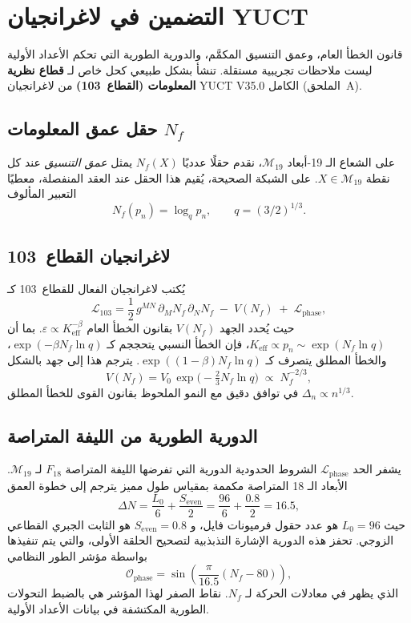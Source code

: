 \documentclass[11pt,a4paper]{article}
\begin{document}
	\section{التضمين في لاغرانجيان YUCT}
	\label{sec:lagrangian-embedding}
	
	قانون الخطأ العام، وعمق التنسيق المكمَّم، والدورية الطورية التي تحكم الأعداد الأولية ليست ملاحظات تجريبية مستقلة. تنشأ بشكل طبيعي كحل خاص لـ \textbf{قطاع نظرية المعلومات (القطاع~103)} من لاغرانجيان YUCT V35.0 الكامل (الملحق~A).
	
	\subsection{حقل عمق المعلومات \(N_f\)}
	
	على الشعاع الـ 19-أبعاد \(\mathcal{M}_{19}\)، نقدم حقلًا عدديًا \(N_f(X)\) يمثل \emph{عمق التنسيق} عند كل نقطة \(X \in \mathcal{M}_{19}\). على الشبكة الصحيحة، يُقيم هذا الحقل عند العقد المنفصلة، معطيًا التعبير المألوف
	\[
	N_f(p_n) = \log_q p_n, \qquad q = (3/2)^{1/3}.
	\]
	
	\subsection{لاغرانجيان القطاع~103}
	
	يُكتب لاغرانجيان الفعال للقطاع~103 كـ
	\begin{equation}\label{eq:L103}
		\mathcal{L}_{103} =
		\frac{1}{2}\,g^{MN}\,\partial_M N_f\,\partial_N N_f
		\;-\; V(N_f)
		\;+\; \mathcal{L}_{\text{phase}},
	\end{equation}
	حيث يُحدد الجهد \(V(N_f)\) بقانون الخطأ العام \(\varepsilon \propto K_{\mathrm{eff}}^{-\beta}\). بما أن \(K_{\mathrm{eff}} \propto p_n \sim \exp(N_f \ln q)\)، فإن الخطأ النسبي يتحججم كـ \(\exp(-\beta N_f \ln q)\)، والخطأ المطلق يتصرف كـ \(\exp((1-\beta) N_f \ln q)\). يترجم هذا إلى جهد بالشكل
	\[
	V(N_f) = V_0 \, \exp\!\bigl(-\tfrac{2}{3} N_f \ln q\bigr)
	\;\propto\; N_f^{-2/3},
	\]
	في توافق دقيق مع النمو الملحوظ بقانون القوى للخطأ المطلق \(\Delta_n \propto n^{1/3}\).
	
	\subsection{الدورية الطورية من الليفة المتراصة}
	
	يشفر الحد \(\mathcal{L}_{\text{phase}}\) الشروط الحدودية الدورية التي تفرضها الليفة المتراصة \(F_{18}\) لـ \(\mathcal{M}_{19}\). الأبعاد الـ 18 المتراصة مكممة بمقياس طول مميز يترجم إلى خطوة العمق
	\[
	\Delta N = \frac{L_0}{6} + \frac{S_{\mathrm{even}}}{2}
	= \frac{96}{6} + \frac{0.8}{2} = 16.5,
	\]
	حيث \(L_0=96\) هو عدد حقول فرميونات فايل، و \(S_{\mathrm{even}}=0.8\) هو الثابت الجبري القطاعي الزوجي. تحفز هذه الدورية الإشارة التذبذبية لتصحيح الحلقة الأولى، والتي يتم تنفيذها بواسطة مؤشر الطور النظامي
	\[
	\mathcal{O}_{\text{phase}} = \sin\!\left(\frac{\pi}{16.5}(N_f-80)\right),
	\]
	الذي يظهر في معادلات الحركة لـ \(N_f\). نقاط الصفر لهذا المؤشر هي بالضبط التحولات الطورية المكتشفة في بيانات الأعداد الأولية.
	
\end{document}
